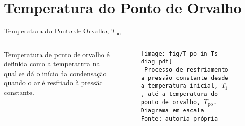 \section{Temperatura do Ponto de Orvalho}

    \begin{frame}{Temperatura do Ponto de Orvalho, $T_{\mathrm{po}}$}\vspace*{-2em}
        \begin{columns}
            \begin{definition}
                \alert{Temperatura de ponto de orvalho} é definida como a temperatura na qual se
                dá o \alert{início da condensação} quando o ar é resfriado à \alert{pressão
                constante}.
            \end{definition}
            \begin{center}
                \begin{figure}
                    \fontsize{5.0}{5}\selectfont
                    \texttt{[image: fig/T-po-in-Ts-diag.pdf]}
                    \\\vspace*{-0.0em}\texttt{%
                        Processo de resfriamento a pressão constante desde a temperatura
                        inicial, $T_1$, até a temperatura do ponto de orvalho,
                        $T_{\mathrm{po}}$. Diagrama em escala \\
                        Fonte: autoria própria
                    }
                \end{figure}
            \end{center}
        \end{columns}
    \end{frame}

    \begin{frame}\vspace*{-2em}
    \end{frame}

